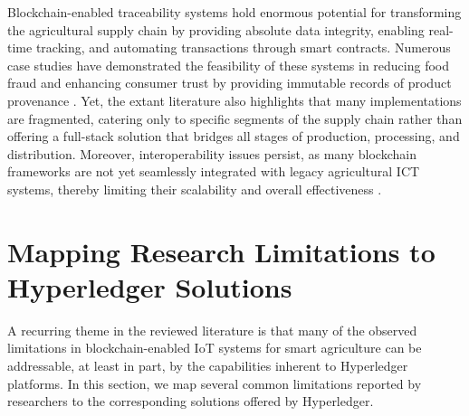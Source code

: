 \documentclass[12pt,onecolumn]{IEEEtran} %
\begin{document}
Blockchain-enabled traceability systems hold enormous potential for transforming the agricultural supply chain by providing absolute data integrity, enabling real-time tracking, and automating transactions through smart contracts. Numerous case studies have demonstrated the feasibility of these systems in reducing food fraud and enhancing consumer trust by providing immutable records of product provenance \cite{akella2023asystematicreview, mwewa2024blockchaintechnologya}. Yet, the extant literature also highlights that many implementations are fragmented, catering only to specific segments of the supply chain rather than offering a full-stack solution that bridges all stages of production, processing, and distribution. Moreover, interoperability issues persist, as many blockchain frameworks are not yet seamlessly integrated with legacy agricultural ICT systems, thereby limiting their scalability and overall effectiveness \cite{akella2023asystematicreview}.

\section*{Mapping Research Limitations to Hyperledger Solutions}

A recurring theme in the reviewed literature is that many of the observed limitations in blockchain-enabled IoT systems for smart agriculture can be addressable, at least in part, by the capabilities inherent to Hyperledger platforms. In this section, we map several common limitations reported by researchers to the corresponding solutions offered by Hyperledger.
\end{document}
